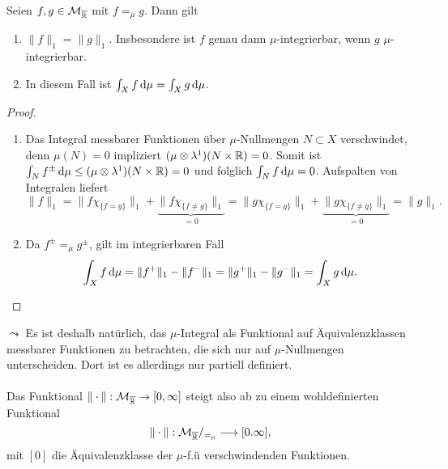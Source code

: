 \begin{lemma}
\begin{mdframed}
Seien $f,g \in \mathcal{M}_{\overline{\mathbb{R}}}$ mit $f=_\mu g$. Dann gilt
\begin{enumerate}
\item $\|f\|_1=\|g\|_1$. Insbesondere ist $f$ genau dann $\mu$-integrierbar, wenn $g$ $\mu$-integrierbar.
\item In diesem Fall ist $\int_X f \, \mathrm{d}\mu =\int_X g \, \mathrm{d} \mu$.
\end{enumerate}
\end{mdframed}
\begin{proof}
\begin{enumerate}
\item Das Integral messbarer Funktionen über $\mu$-Nullmengen $N\subset X$ verschwindet, denn $\mu(N)=0$ impliziert $(\mu\otimes \lambda^1)(N\times \mathbb{R})=0$. Somit ist ${\int_Nf^\pm \, \mathrm{d}\mu}\leq (\mu \otimes \lambda^1)(N\times \mathbb{R})=0$ und folglich $\int_N f\, \mathrm{d}\mu=0$. Aufspalten von Integralen liefert
$$
\|f\|_1=\|f\chi_{\{f=g\}}\|_1+\underbrace{\|f\chi_{\{f\neq g\}}\|_1}_{=0}= \|g\chi_{\{f=g\}}\|_1+\underbrace{\|g\chi_{\{f\neq g\}}\|_1}_{=0}=\|g\|_1.
$$
\item Da $f^\pm=_\mu g^\pm$, gilt im integrierbaren Fall
$$
\int_Xf\, \mathrm{d}\mu =\|f^+\|_1-\|f^-\|_1=\|g^+\|_1-\|g^-\|_1=\int_X g\, \mathrm{d} \mu.
$$
\end{enumerate}
\end{proof}
\end{lemma}
$\leadsto$ Es ist deshalb natürlich, das $\mu$-Integral als Funktional auf Äquivalenzklassen messbarer Funktionen zu betrachten, die sich nur auf $\mu$-Nullmengen unterscheiden. Dort ist es allerdings nur partiell definiert.\\\\
Das Funktional $\|\cdot \|: \mathcal{M}_{\overline{\mathbb{R}}} \to [0,\infty]$ steigt also ab zu einem wohldefinierten Funktional
$$\|\cdot\|:\mathcal{M}_{\overline{\mathbb{R}}}/_{=_\mu}\longrightarrow [0.\infty],$$
mit $[0]$ die Äquivalenzklasse der $\mu$-f.ü verschwindenden Funktionen.

